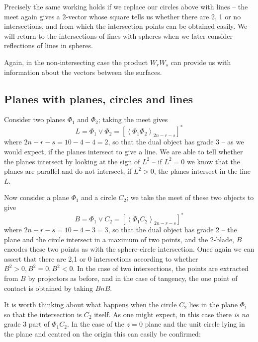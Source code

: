 Precisely the same working holds if we replace our
circles above with lines -- the meet again gives a
2-vector whose square tells us whether there are 2, 1 or
no intersections, and from which the intersection points
can be obtained easily. We will return to the
intersections of lines with spheres when we later
consider reflections of lines in spheres.

Again, in the non-intersecting case the product $W_rW_s$
can provide us with information about the vectors between
the surfaces.




\subsection{Planes with planes, circles and lines }

Consider two planes $\Phi_1$ and $\Phi_2$; taking the
meet gives
%
\begin{equation}
L = \Phi_1 \vee \Phi_2 = \left[\left< \Phi_1 \Phi_2
\right>_{2n-r-s}\right]^*
\end{equation}
%
where $2n-r-s=10-4-4=2$, so that the dual object has
grade 3 -- as we would expect, if the planes intersect to
give a line. We are able to tell whether the planes
intersect by looking at the sign of $L^2$ -- if $L^2=0$
we know that the planes are parallel and do not
intersect, if $L^2>0$, the planes intersect in the line
$L$.

Now consider a plane $\Phi_1$ and a circle $C_2$; we take
the meet of these two objects to give
%
\begin{equation}
B = \Phi_1 \vee C_2 = \left[\left< \Phi_1 C_2
\right>_{2n-r-s}\right]^*
\end{equation}
%
where $2n-r-s=10-4-3=3$, so that the dual object has
grade 2 -- the plane and the circle intersect in a
maximum of two points, and the 2-blade, $B$ encodes these
two points as with the sphere-circle intersection. Once
again we can assert that there are 2,1 or 0 intersections
according to whether $B^2>0,B^2=0,B^2<0$. In the case of
two intersections, the points are extracted from $B$ by
projectors as before, and in the case of tangency, the
one point of contact is obtained by taking $BnB$.

It is worth thinking about what happens when the circle
$C_2$ lies in the plane $\Phi_1$ so that the intersection is
$C_2$ itself. As one might expect, in this case there \emph{is
no} grade 3 part of $\Phi_1C_2$. In the case of the $z=0$ plane and
the unit circle lying in the plane and centred on the origin this can
easily be confirmed:

